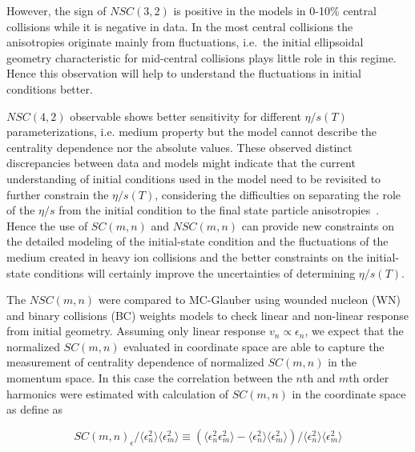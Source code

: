 However, the sign of $NSC(3,2)$ is positive in the models in 0-10\% central collisions while it is negative in data.
In the most central collisions the anisotropies originate mainly from fluctuations, i.e.\ the initial ellipsoidal geometry characteristic for mid-central collisions plays little role in this regime. Hence this observation will help to understand the fluctuations in initial conditions better.

$NSC(4,2)$ observable shows better sensitivity for different $\eta/s(T)$ parameterizations, i.e. medium property but the model cannot describe the centrality dependence nor the absolute values. These observed distinct discrepancies between data and models might indicate that the current understanding of initial conditions used in the model need to be revisited
to further constrain the $\eta/s(T)$, considering the difficulties on separating the role of the $\eta/s$  from the initial condition to the final state particle anisotropies~\cite{Romatschke:2007mq,Shen:2011zc}.
Hence the use of $SC(m,n)$ and $NSC(m,n)$ can provide new constraints on the detailed modeling of the initial-state condition and the fluctuations of the medium created in heavy ion collisions and the better constraints on the initial-state conditions will certainly improve the uncertainties of determining $\eta/s(T)$.



 The  $NSC(m,n)$ were compared to MC-Glauber using wounded nucleon (WN) and binary collisions (BC) weights models to check linear and non-linear response from initial geometry.  Assuming only linear response $v_n \propto \epsilon_n$, we expect that the normalized $SC(m,n)$ evaluated in coordinate space are able to capture the measurement of centrality dependence of normalized $SC(m,n)$ in the momentum space. In this case the correlation between the $n$th and $m$th order harmonics were estimated with calculation of $SC(m,n)$ in the coordinate space as define as 
 
 \begin{equation}
SC(m,n)_{\epsilon}/\langle \epsilon_n^2 \rangle \langle \epsilon_m^2 \rangle  \equiv (\langle \epsilon_n^2 \epsilon_m^2 \rangle - \langle \epsilon_n^2 \rangle \langle \epsilon_m^2 \rangle) /  \langle \epsilon_n^2 \rangle \langle \epsilon_m^2 \rangle
\label{eq:sc_ecen}
\end{equation}

